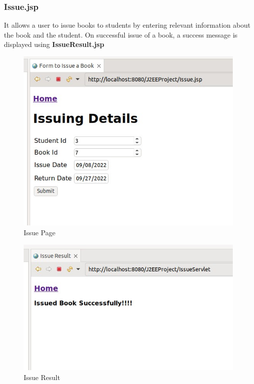 \documentclass{article}
\begin{document}
\subsubsection{Issue.jsp}
It allows a user to issue books to students by entering relevant information about the book and the student.
On successful issue of a book, a success message is displayed using \textbf{IssueResult.jsp}
\begin{figure}[!ht]
  \begin{center}
    \includegraphics[scale=0.5]{3_issue.jpg}
  \caption{Issue Page}
  \end{center}
\end{figure}
\begin{figure}[!ht]
  \begin{center}
    \includegraphics[scale=0.5]{3_issue_result.jpg}
  \caption{Issue Result}
  \end{center}
\end{figure}
\end{document}
